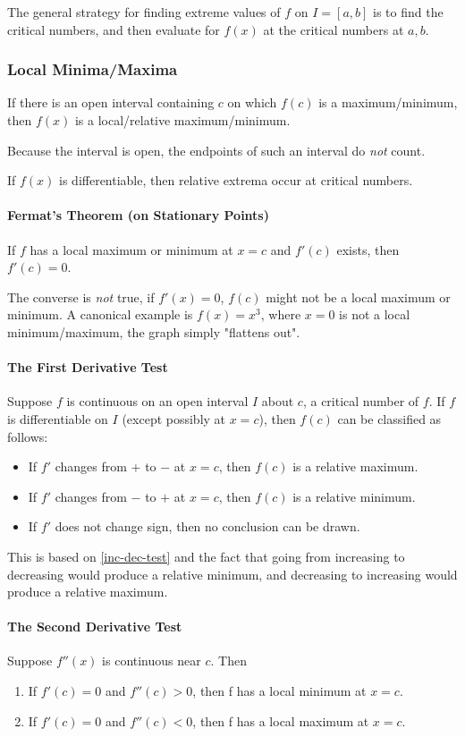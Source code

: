 \documentclass{article}
\begin{document}
The general strategy for finding extreme values of $f$ on $I = [a,b]$ is to find the critical numbers, and then evaluate for $f(x)$ at the critical numbers at $a,b$.

\subsubsection{Local Minima/Maxima}
If there is an open interval containing $c$ on which $f(c)$ is a maximum/minimum, then $f(x)$ is a local/relative maximum/minimum.

Because the interval is open, the endpoints of such an interval do \emph{not} count.

If $f(x)$ is differentiable, then relative extrema occur at critical numbers.

\paragraph{Fermat's Theorem (on Stationary Points)}
If $f$ has a local maximum or minimum at $x=c$ and $f'(c)$ exists, then $f'(c)=0$.

The converse is \emph{not} true, if $f'(x) = 0$, $f(c)$ might not be a local maximum or minimum. A canonical example is $f(x) = x^3$, where $x=0$ is not a local minimum/maximum, the graph simply "flattens out".

\paragraph{The First Derivative Test} Suppose $f$ is continuous on an open interval $I$ about $c$, a critical number of $f$. If $f$ is differentiable on $I$ (except possibly at $x=c$), then $f(c)$ can be classified as follows:
\begin{itemize}
    \item If $f'$ changes from $+$ to $-$ at $x=c$, then $f(c)$ is a relative maximum.
    \item If $f'$ changes from $-$ to $+$ at $x=c$, then $f(c)$ is a relative minimum.
    \item If $f'$ does not change sign, then no conclusion can be drawn.
\end{itemize}

This is based on \ref{inc-dec-test} and the fact that going from increasing to decreasing would produce a relative minimum, and decreasing to increasing would produce a relative maximum.

\paragraph{The Second Derivative Test} Suppose $f''(x)$ is continuous near $c$. Then \begin{enumerate}
    \item If $f'(c) = 0$ and $f''(c) > 0$, then f has a local minimum at $x=c$.
    \item If $f'(c) = 0$ and $f''(c) < 0$, then f has a local maximum at $x=c$.
\end{enumerate}
\end{document}
